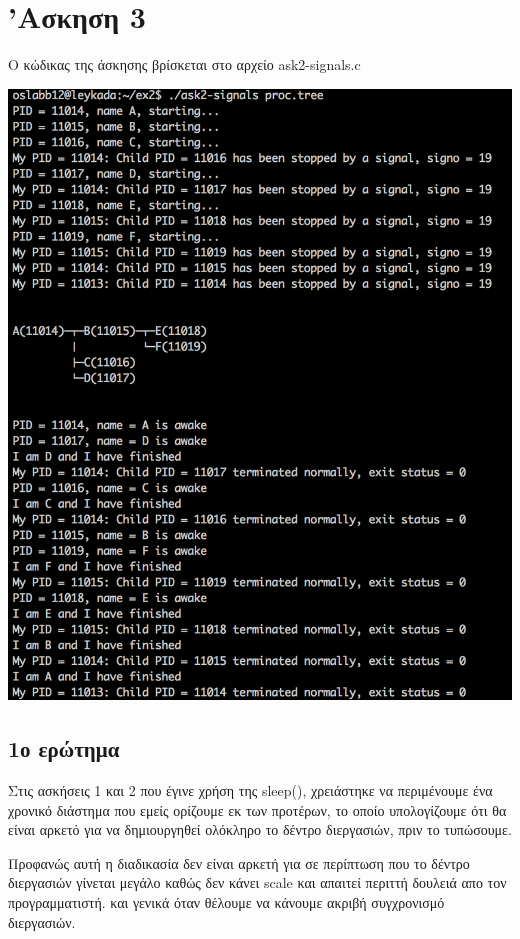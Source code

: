 \documentclass[12pt]{article}
\begin{document}
\section*{'Ασκηση 3}

Ο κώδικας της άσκησης βρίσκεται στο αρχείο \textlatin{ask2-signals.c}

\includegraphics[scale=0.5]{ask2-signals.png}


\subsection*{1ο ερώτημα}

Στις ασκήσεις 1 και 2 που έγινε χρήση της \textlatin{sleep()}, χρειάστηκε να περιμένουμε ένα χρονικό διάστημα που εμείς 
ορίζουμε εκ των προτέρων, το οποίο υπολογίζουμε ότι θα είναι αρκετό για να δημιουργηθεί ολόκληρο το δέντρο διεργασιών,
πριν το τυπώσουμε.

Προφανώς αυτή η διαδικασία δεν είναι αρκετή για σε περίπτωση που το δέντρο διεργασιών γίνεται μεγάλο καθώς δεν κάνει \textlatin{scale}
και απαιτεί περιττή δουλειά απο τον προγραμματιστή.
και γενικά όταν θέλουμε να κάνουμε ακριβή συγχρονισμό διεργασιών.
\end{document}
